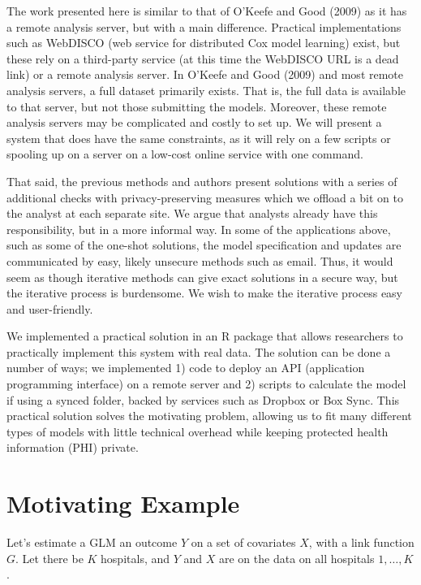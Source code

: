 \documentclass[]{elsarticle} %
\begin{document}
The work presented here is similar to that of O'Keefe and Good (2009) as
it has a remote analysis server, but with a main difference. Practical
implementations such as WebDISCO (web service for distributed Cox model
learning) exist, but these rely on a third-party service (at this time
the WebDISCO URL is a dead link) or a remote analysis server. In O'Keefe
and Good (2009) and most remote analysis servers, a full dataset
primarily exists. That is, the full data is available to that server,
but not those submitting the models. Moreover, these remote analysis
servers may be complicated and costly to set up. We will present a
system that does have the same constraints, as it will rely on a few
scripts or spooling up on a server on a low-cost online service with one
command.

That said, the previous methods and authors present solutions with a
series of additional checks with privacy-preserving measures which we
offload a bit on to the analyst at each separate site. We argue that
analysts already have this responsibility, but in a more informal way.
In some of the applications above, such as some of the one-shot
solutions, the model specification and updates are communicated by easy,
likely unsecure methods such as email. Thus, it would seem as though
iterative methods can give exact solutions in a secure way, but the
iterative process is burdensome. We wish to make the iterative process
easy and user-friendly.

We implemented a practical solution in an R package that allows
researchers to practically implement this system with real data. The
solution can be done a number of ways; we implemented 1) code to deploy
an API (application programming interface) on a remote server and 2)
scripts to calculate the model if using a synced folder, backed by
services such as Dropbox or Box Sync. This practical solution solves the
motivating problem, allowing us to fit many different types of models
with little technical overhead while keeping protected health
information (PHI) private.

\hypertarget{motivating-example}{%
\section{Motivating Example}\label{motivating-example}}

Let's estimate a GLM an outcome \(Y\) on a set of covariates \(X\), with
a link function \(G\). Let there be \(K\) hospitals, and \(Y\) and \(X\)
are on the data on all hospitals \(1, \dots, K\).
\end{document}
